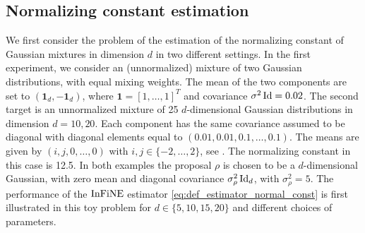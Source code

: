 \documentclass{article}
\begin{document}
\subsection{Normalizing constant estimation}
\label{subsec:estim_constant}
We first consider the problem of the estimation of the normalizing constant of Gaussian mixtures in dimension $d$ in two different settings. In the first experiment, we consider an (unnormalized)  mixture of two Gaussian distributions, with equal mixing weights. The mean of the two components are set to $(\mathbf{1}_d, -\mathbf{1}_d)$, where $\mathbf{1}= [1,\dots,1]^T$ and covariance $\sigma ^2 \operatorname{Id} = 0.02$.
The second target is an unnormalized mixture of 25 $d$-dimensional Gaussian distributions in dimension $d=10,20$. Each component has the same covariance assumed to be diagonal with diagonal elements equal to $(0.01,0.01, 0.1, \ldots, 0.1)$. The means are given by $(i,j,0,\ldots,0)$ with $i,j \in \{-2,\ldots, 2\}$, see .  The normalizing constant in this case is 12.5. In both examples the proposal $\rho$ is chosen to be a $d$-dimensional Gaussian, with zero mean and diagonal covariance $\sigma^2_\rho \operatorname{Id}_d$, with $\sigma^2_\rho=5$. %
The performance of the $\operatorname{InFiNE}$ estimator \eqref{eq:def_estimator_normal_const} is first illustrated in this toy problem for $d\in\{5,10,15,20\}$ and different choices of parameters.
\end{document}
